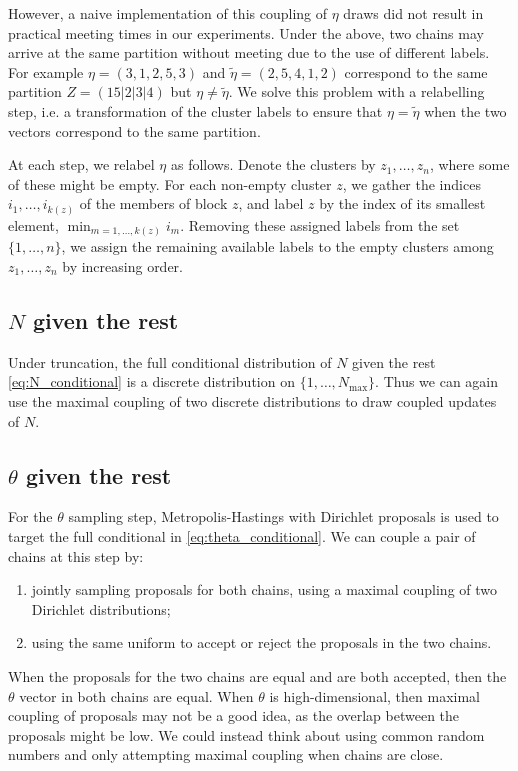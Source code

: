 \documentclass{article}
\begin{document}
However, a naive implementation of this coupling of $\eta$ draws did not result in practical meeting times in our experiments.
Under the above, 
two chains may arrive at the same partition without meeting due to the use of different labels.
For example $\eta = (3,1,2,5,3)$ and $\tilde{\eta} = (2,5,4,1,2)$
correspond to the same partition $Z=(15|2|3|4)$ but 
$\eta \neq \tilde{\eta}$.
We solve this problem with a relabelling step, i.e. a transformation of the cluster labels to ensure that $\eta = \tilde{\eta}$ when the two vectors correspond to the same partition.

At each step, we relabel $\eta$ as follows.
Denote the clusters by $z_1,\ldots,z_n$, where some of these might be empty.
For each non-empty cluster $z$, we gather the indices 
$i_1,\ldots,i_{k(z)}$ of the members of block $z$, and
label $z$ by the index of its smallest element, $\min_{m=1,\ldots,k(z)} i_m$. 
Removing these assigned labels
from the set $\{1,\ldots,n\}$, we assign the remaining
available labels to the empty clusters among 
$z_1,\ldots,z_n$ by increasing order.

\subsection{\texorpdfstring{$N$}{N} given the rest}
Under truncation, the full conditional distribution of $N$ given the rest \eqref{eq:N_conditional} is a discrete distribution on $\{1,\ldots,N_{\max}\}$. Thus we can again use the maximal coupling of two discrete distributions to draw coupled updates of $N$.


\subsection{\texorpdfstring{$\theta$}{theta} given the rest}
For the $\theta$ sampling step, Metropolis-Hastings with Dirichlet proposals is used to target the full conditional in \eqref{eq:theta_conditional}. We can couple a pair of chains at this step by:
\begin{enumerate}
    \item jointly sampling proposals for both chains, using a maximal coupling of two Dirichlet distributions; 
    \item using the same uniform to accept or reject the proposals in the two chains.
\end{enumerate}

When the proposals for the two chains are equal and are both accepted, then the $\theta$ vector in both chains are equal.  When $\theta$ is high-dimensional, then maximal coupling of proposals may not be a good idea, as the overlap between the proposals
might be low. We could instead think about using common random numbers and only attempting maximal coupling when chains
are close. 
\end{document}
